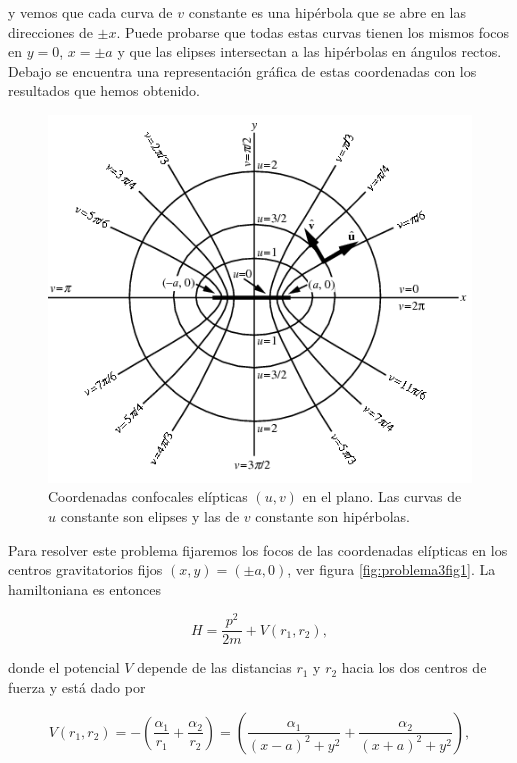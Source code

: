 \documentclass[a4paper,10pt]{article}
\numberwithin{equation}{section}
\begin{document}
y vemos que cada curva de $v$ constante es una hipérbola que se abre en las direcciones 
de $\pm x$. Puede probarse \cite{arfken} que todas estas curvas tienen los mismos focos en $y=0$, 
$x= \pm a$ y que las elipses intersectan a las hipérbolas en ángulos rectos. Debajo se encuentra 
una representación gráfica de estas coordenadas con los resultados que hemos obtenido.

\begin{figure}[H]
 \center 
 \includegraphics[scale=0.7]{problema3fig1}
 \caption{Coordenadas confocales elípticas $(u,v)$ en el plano. Las curvas de 
 $u$ constante son elipses y las de $v$ constante son hipérbolas.}
 \label{fig:problema3fig1}
\end{figure}

Para resolver este problema fijaremos los focos de las coordenadas elípticas en los 
centros gravitatorios fijos $(x,y) = (\pm a,0)$, ver figura \eqref{fig:problema3fig1}. La hamiltoniana es entonces 

\begin{equation}
 H = \frac{p^2}{2m} + V(r_1,r_2),
\end{equation}

donde el potencial $V$ depende de las distancias $r_1$ y $r_2$ hacia los dos 
centros de fuerza y está dado por 

\begin{equation}
 V(r_1,r_2) = - \left(\frac{\alpha_1}{r_1} + \frac{\alpha_2}{r_2} \right)
  = \left(\frac{\alpha_1}{(x - a)^2 + y^2} + \frac{\alpha_2}{(x + a)^2 + y^2}\right),
\end{equation}
\end{document}
